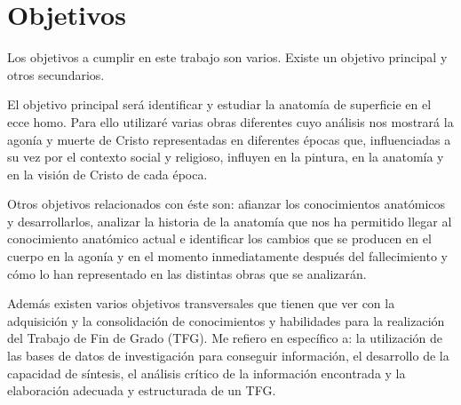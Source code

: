 \section{Objetivos}
Los objetivos a cumplir en este trabajo son varios. Existe un objetivo principal y otros secundarios.

El objetivo principal será identificar y estudiar la anatomía de superficie en el ecce homo. Para ello utilizaré varias obras diferentes cuyo análisis nos mostrará la agonía y muerte de Cristo representadas en diferentes épocas que, influenciadas a su vez por el contexto social y religioso, influyen en la pintura, en la anatomía y en la visión de Cristo de cada época.

Otros objetivos relacionados con éste son: afianzar los conocimientos anatómicos y desarrollarlos, analizar la historia de la anatomía que nos ha permitido llegar al conocimiento anatómico actual e identificar los cambios que se producen en el cuerpo en la agonía y en el momento inmediatamente después del fallecimiento y cómo lo han representado en las distintas obras que se analizarán.

Además existen varios objetivos transversales que tienen que ver con la adquisición y la consolidación de conocimientos y habilidades para la realización del Trabajo de Fin de Grado (TFG). Me refiero en específico a: la utilización de las bases de datos de investigación para conseguir información, el desarrollo de la capacidad de síntesis, el análisis crítico de la información encontrada y la elaboración adecuada y estructurada de un TFG.